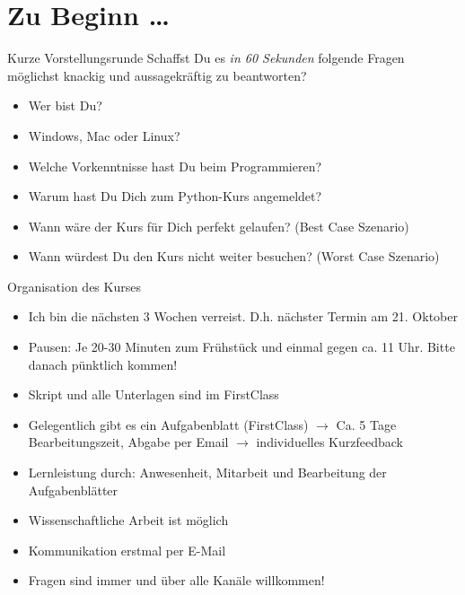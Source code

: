 \section{Zu Beginn \dots}

\begin{frame}
\begin{block}{Kurze Vorstellungsrunde}
	\vspace{2pt}
	Schaffst Du es \emph{in 60 Sekunden} folgende Fragen möglichst knackig und aussagekräftig zu beantworten?
	\begin{itemize}
		\item Wer bist Du? 
		\item Windows, Mac oder Linux?
		\item Welche Vorkenntnisse hast Du beim Programmieren?  
		\item Warum hast Du Dich zum Python-Kurs angemeldet? 
		\item Wann wäre der Kurs für Dich perfekt gelaufen? (Best Case Szenario)
		\item Wann würdest Du den Kurs nicht weiter besuchen? (Worst Case Szenario)
	\end{itemize}
\end{block}
\end{frame}


\begin{frame}
	\begin{block}{Organisation des Kurses}
		\pause 
		\begin{itemize}[<+->]
			\item Ich bin die nächsten 3 Wochen verreist. D.h. nächster Termin am 21. Oktober 
			\item Pausen: Je 20-30 Minuten zum Frühstück und einmal gegen ca. 11 Uhr. Bitte danach pünktlich kommen! 
			\item Skript und alle Unterlagen sind im FirstClass
			\item Gelegentlich gibt es ein Aufgabenblatt (FirstClass) $\rightarrow$ Ca. 5 Tage Bearbeitungszeit, Abgabe per Email $\rightarrow$ individuelles Kurzfeedback
			\item Lernleistung durch: Anwesenheit, Mitarbeit und Bearbeitung der Aufgabenblätter 
			\item Wissenschaftliche Arbeit ist möglich
			\item Kommunikation erstmal per E-Mail
			\item Fragen sind immer und über alle Kanäle willkommen!
		\end{itemize}
	\end{block}
\end{frame}


